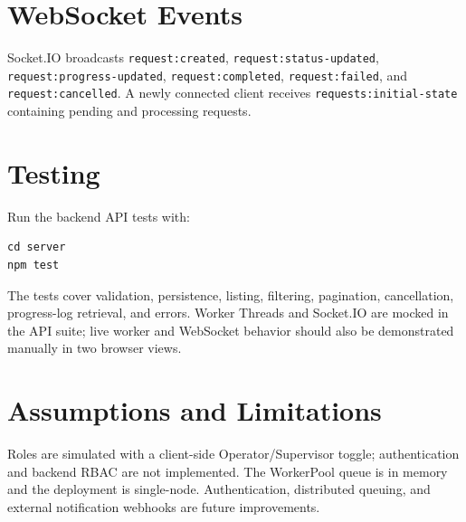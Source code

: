 \documentclass[11pt,a4paper]{article}
\begin{document}
\section{WebSocket Events}
Socket.IO broadcasts \texttt{request:created}, \texttt{request:status-updated}, \texttt{request:progress-updated}, \texttt{request:completed}, \texttt{request:failed}, and \texttt{request:cancelled}. A newly connected client receives \texttt{requests:initial-state} containing pending and processing requests.

\section{Testing}
Run the backend API tests with:
\begin{verbatim}
cd server
npm test
\end{verbatim}
The tests cover validation, persistence, listing, filtering, pagination, cancellation, progress-log retrieval, and errors. Worker Threads and Socket.IO are mocked in the API suite; live worker and WebSocket behavior should also be demonstrated manually in two browser views.

\section{Assumptions and Limitations}
Roles are simulated with a client-side Operator/Supervisor toggle; authentication and backend RBAC are not implemented. The WorkerPool queue is in memory and the deployment is single-node. Authentication, distributed queuing, and external notification webhooks are future improvements.
\end{document}
